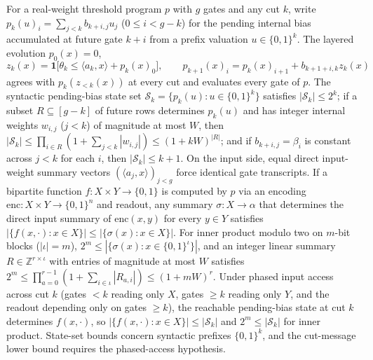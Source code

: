 \begin{result}
For a real-weight threshold program $p$ with $g$ gates and any cut $k$, write
$p_k(u)_i=\sum_{j<k}b_{k+i,j}u_j$ ($0\le i<g-k$) for the pending internal bias
accumulated at future gate $k+i$ from a prefix valuation $u\in\{0,1\}^k$. The
layered evolution $p_0(x)=0$,
\[
z_k(x)=\mathbf 1\!\big[\theta_k\le\langle a_k,x\rangle+p_k(x)_0\big],\qquad
p_{k+1}(x)_i=p_k(x)_{i+1}+b_{k+1+i,k}z_k(x)
\]
agrees with $p_k(z_{<k}(x))$ at every cut and evaluates every gate of $p$. The
syntactic pending-bias state set $\mathcal S_k=\{p_k(u):u\in\{0,1\}^k\}$
satisfies $|\mathcal S_k|\le 2^k$; if a subset $R\subseteq[g-k]$ of future rows
determines $p_k(u)$ and has integer internal weights $w_{i,j}$ ($j<k$) of
magnitude at most $W$, then
$|\mathcal S_k|\le\prod_{i\in R}(1+\sum_{j<k}|w_{i,j}|)\le(1+kW)^{|R|}$; and if
$b_{k+i,j}=\beta_i$ is constant across $j<k$ for each $i$, then
$|\mathcal S_k|\le k+1$.
On the input side, equal direct input-weight summary vectors
$(\langle a_j,x\rangle)_{j<g}$ force identical gate transcripts. If a bipartite
function $f:X\times Y\to\{0,1\}$ is computed by $p$ via an encoding
$\mathrm{enc}:X\times Y\to\{0,1\}^n$ and readout, any summary
$\sigma:X\to\alpha$ that determines the direct input summary of
$\mathrm{enc}(x,y)$ for every $y\in Y$ satisfies
$|\{f(x,\cdot):x\in X\}|\le|\{\sigma(x):x\in X\}|$. For inner product modulo
two on $m$-bit blocks ($|\iota|=m$), $2^m\le|\{\sigma(x):x\in\{0,1\}^\iota\}|$,
and an integer linear summary $R\in\mathbb Z^{r\times\iota}$ with entries of
magnitude at most $W$ satisfies
$2^m\le\prod_{a=0}^{r-1}(1+\sum_{i\in\iota}|R_{a,i}|)\le(1+mW)^r$. Under phased
input access across cut $k$ (gates $<k$ reading only $X$, gates $\ge k$ reading
only $Y$, and the readout depending only on gates $\ge k$), the reachable
pending-bias state at cut $k$ determines $f(x,\cdot)$, so
$|\{f(x,\cdot):x\in X\}|\le|\mathcal S_k|$ and $2^m\le|\mathcal S_k|$ for inner
product. State-set bounds concern syntactic prefixes $\{0,1\}^k$, and the
cut-message lower bound requires the phased-access hypothesis.\citep{ThresholdCircuitRepresentations2026}

\end{result}
